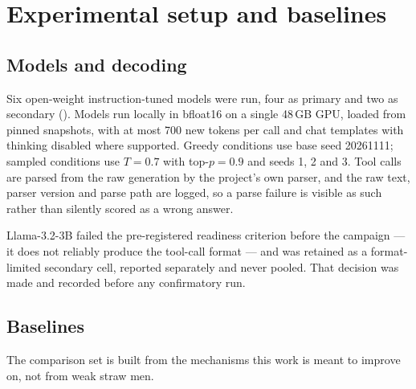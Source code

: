 \section{Experimental setup and baselines}
\label{sec:setup}



\subsection{Models and decoding}

Six open-weight instruction-tuned models were run, four as primary and two as secondary
(). Models run locally in bfloat16 on a single 48\,GB GPU, loaded from pinned snapshots, with at
most 700 new tokens per call and chat templates with thinking disabled where supported. Greedy conditions use base
seed 20261111; sampled conditions use $T=0.7$ with top-$p=0.9$ and seeds 1, 2 and 3. Tool calls are parsed from
the raw generation by the project's own parser, and the raw text, parser version and parse path are logged, so a
parse failure is visible as such rather than silently scored as a wrong answer.

Llama-3.2-3B failed the pre-registered readiness criterion before the campaign --- it does not reliably produce the
tool-call format --- and was retained as a format-limited secondary cell, reported separately and never pooled.
That decision was made and recorded before any confirmatory run.

\subsection{Baselines}

The comparison set is built from the mechanisms this work is meant to improve on, not from weak straw men.

